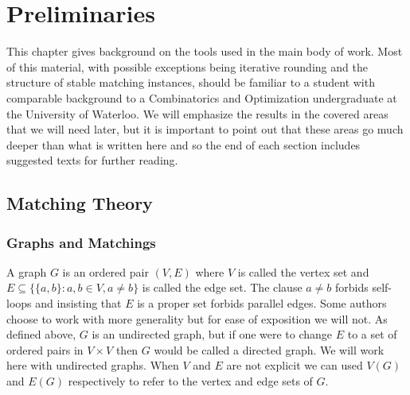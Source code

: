 \chapter{Preliminaries}
This chapter gives background on the tools used in the main body of work. Most of this material, with possible exceptions being iterative rounding and the structure of stable matching instances, should be familiar to a student with comparable background to a Combinatorics and Optimization undergraduate at the University of Waterloo. We will emphasize the results in the covered areas that we will need later, but it is important to point out that these areas go much deeper than what is written here and so the end of each section includes suggested texts for further reading.

\section{Matching Theory}
\subsection{Graphs and Matchings}
\begin{definition} A graph $G$ is an ordered pair $(V,E)$ where $V$ is called the vertex set and $E \subseteq \{\{a,b\} : a,b \in V, a \neq b\}$ is called the edge set. The clause $a \neq b$ forbids self-loops and insisting that $E$ is a proper set forbids parallel edges. Some authors choose to work with more generality but for ease of exposition we will not. As defined above, $G$ is an undirected graph, but if one were to change $E$ to a set of ordered pairs in $V \times V$ then $G$ would be called a directed graph. We will work here with undirected graphs. When $V$ and $E$ are not explicit we can used $V(G)$ and $E(G)$ respectively to refer to the vertex and edge sets of $G$.
\end{definition}
